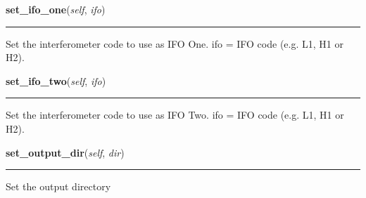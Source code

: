     \label{stochastic:StochasticNode:set_ifo_one}
    \vspace{0.5ex}

    \begin{boxedminipage}{\textwidth}

    \raggedright \textbf{set\_ifo\_one}(\textit{self}, \textit{ifo})

    \vspace{-1.5ex}

    \rule{\textwidth}{0.5\fboxrule}
    Set the interferometer code to use as IFO One. ifo = IFO code (e.g. 
    L1, H1 or H2).

    \vspace{1ex}

    \end{boxedminipage}

    \label{stochastic:StochasticNode:set_ifo_two}
    \vspace{0.5ex}

    \begin{boxedminipage}{\textwidth}

    \raggedright \textbf{set\_ifo\_two}(\textit{self}, \textit{ifo})

    \vspace{-1.5ex}

    \rule{\textwidth}{0.5\fboxrule}
    Set the interferometer code to use as IFO Two. ifo = IFO code (e.g. 
    L1, H1 or H2).

    \vspace{1ex}

    \end{boxedminipage}

    \label{stochastic:StochasticNode:set_output_dir}
    \vspace{0.5ex}

    \begin{boxedminipage}{\textwidth}

    \raggedright \textbf{set\_output\_dir}(\textit{self}, \textit{dir})

    \vspace{-1.5ex}

    \rule{\textwidth}{0.5\fboxrule}
    Set the output directory

    \vspace{1ex}

    \end{boxedminipage}


